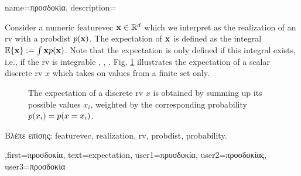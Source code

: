 {name={\foreignlanguage{greek}{προσδοκία}}, 
  description={Consider a numeric \gls{featurevec} ${\bf x} \in \mathbb{R}^{d}$ 
	which we interpret as the \gls{realization} of an \gls{rv} with a \gls{probdist} $p({\bf x})$. 
	The expectation of ${\bf x}$ is defined as the integral $\mathbb{E} \{ {\bf x} \} := \int {\bf x} p({\bf x})$. 
	Note that the expectation is only defined if this integral exists, i.e., if the \gls{rv} is integrable 
	\cite{RudinBookPrinciplesMatheAnalysis}, \cite{BillingsleyProbMeasure}, \cite{HalmosMeasure}. 
	Fig. \ref{fig_expect_discrete} illustrates the expectation of a scalar discrete \gls{rv} $x$ which takes on values 
	from a finite set only. 
   	\begin{figure}[H]
   	\begin{center}
	\end{center}
	\vspace*{-5mm}
	\caption{The expectation of a discrete \gls{rv} $x$ is obtained by summing up its possible values $x_{i}$, weighted 
	by the corresponding \gls{probability} $p(x_i) = p({x= x_i})$. \label{fig_expect_discrete}}
 	\end{figure}
		\foreignlanguage{greek}{Βλέπε επίσης:} \gls{featurevec}, \gls{realization}, \gls{rv}, \gls{probdist}, \gls{probability}.
		},first={\foreignlanguage{greek}{προσδοκία}},
		text={expectation},
		user1={\foreignlanguage{greek}{προσδοκία}}, %
		user2={\foreignlanguage{greek}{προσδοκίας}}, %
		user3={\foreignlanguage{greek}{προσδοκία}} %
}

